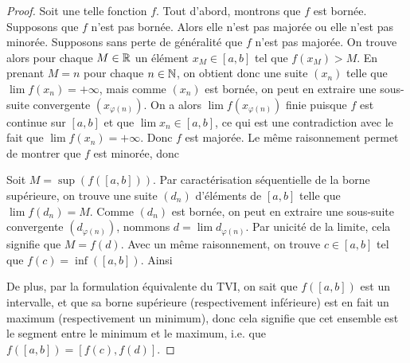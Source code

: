 \begin{proof}
    Soit une telle fonction $f$. Tout d'abord, montrons que $f$ est bornée. Supposons que $f$ n'est pas bornée. Alors elle n'est pas majorée ou elle n'est pas minorée. Supposons sans perte de généralité que $f$ n'est pas majorée. On trouve alors pour chaque $M\in\mathbb{R}$ un élément $x_M \in [a,b]$ tel que $f(x_M) > M$. En prenant $M = n$ pour chaque $n\in\mathbb{N}$, on obtient donc une suite $(x_n)$ telle que $\lim f(x_n) = +\infty$, mais comme $(x_n)$ est bornée, on peut en extraire une sous-suite convergente $(x_{\varphi(n)})$. On a alors $\lim f(x_{\varphi(n)})$ finie puisque $f$ est continue sur $[a,b]$ et que $\lim x_n\in[a,b]$, ce qui est une contradiction avec le fait que $\lim f(x_n) = +\infty$. Donc $f$ est majorée. Le même raisonnement permet de montrer que $f$ est minorée, donc 

    Soit $M = \sup(f([a,b]))$. Par caractérisation séquentielle de la borne supérieure, on trouve une suite $(d_n)$ d'éléments de $[a,b]$ telle que $\lim f(d_n) = M$. Comme $(d_n)$ est bornée, on peut en extraire une sous-suite convergente $(d_{\varphi(n)})$, nommons $d = \lim d_{\varphi(n)}$. Par unicité de la limite, cela signifie que $M = f(d)$. Avec un même raisonnement, on trouve $c\in[a,b]$ tel que $f(c) = \inf([a,b])$. Ainsi 

    De plus, par la formulation équivalente du TVI, on sait que $f([a,b])$ est un intervalle, et que sa borne supérieure (respectivement inférieure) est en fait un maximum (respectivement un minimum), donc cela signifie que cet ensemble est le segment entre le minimum et le maximum, i.e. que $f([a,b]) = [f(c),f(d)]$.
\end{proof}

\newpage